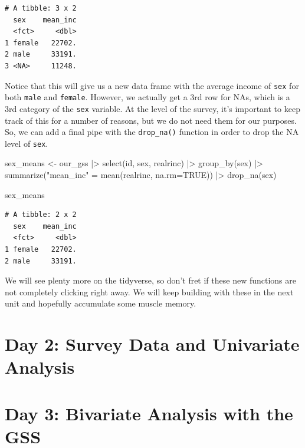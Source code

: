 \documentclass[
  letterpaper,
  DIV=11,
  numbers=noendperiod]{scrreprt}
\newenvironment{Shaded}{\begin{snugshade}}{\end{snugshade}}
\newcommand{\AttributeTok}[1]{\textcolor[rgb]{0.40,0.45,0.13}{#1}}
\newcommand{\ConstantTok}[1]{\textcolor[rgb]{0.56,0.35,0.01}{#1}}
\newcommand{\FunctionTok}[1]{\textcolor[rgb]{0.28,0.35,0.67}{#1}}
\newcommand{\NormalTok}[1]{\textcolor[rgb]{0.00,0.23,0.31}{#1}}
\newcommand{\OtherTok}[1]{\textcolor[rgb]{0.00,0.23,0.31}{#1}}
\newcommand{\SpecialCharTok}[1]{\textcolor[rgb]{0.37,0.37,0.37}{#1}}
\newcommand{\StringTok}[1]{\textcolor[rgb]{0.13,0.47,0.30}{#1}}
\begin{document}
\begin{verbatim}
# A tibble: 3 x 2
  sex    mean_inc
  <fct>     <dbl>
1 female   22702.
2 male     33191.
3 <NA>     11248.
\end{verbatim}

Notice that this will give us a new data frame with the average income
of \texttt{sex} for both \texttt{male} and \texttt{female}. However, we
actually get a 3rd row for NAs, which is a 3rd category of the
\texttt{sex} variable. At the level of the survey, it's important to
keep track of this for a number of reasons, but we do not need them for
our purposes. So, we can add a final pipe with the \texttt{drop\_na()}
function in order to drop the NA level of \texttt{sex}.

\begin{Shaded}
\begin{Highlighting}[]
\NormalTok{sex\_means }\OtherTok{\textless{}{-}}\NormalTok{ our\_gss }\SpecialCharTok{|\textgreater{}}
  \FunctionTok{select}\NormalTok{(id, sex, realrinc) }\SpecialCharTok{|\textgreater{}}
  \FunctionTok{group\_by}\NormalTok{(sex) }\SpecialCharTok{|\textgreater{}}
  \FunctionTok{summarize}\NormalTok{(}\StringTok{"mean\_inc"} \OtherTok{=} \FunctionTok{mean}\NormalTok{(realrinc, }\AttributeTok{na.rm=}\ConstantTok{TRUE}\NormalTok{)) }\SpecialCharTok{|\textgreater{}}
  \FunctionTok{drop\_na}\NormalTok{(sex)}

\NormalTok{sex\_means}
\end{Highlighting}
\end{Shaded}

\begin{verbatim}
# A tibble: 2 x 2
  sex    mean_inc
  <fct>     <dbl>
1 female   22702.
2 male     33191.
\end{verbatim}

We will see plenty more on the tidyverse, so don't fret if these new
functions are not completely clicking right away. We will keep building
with these in the next unit and hopefully accumulate some muscle memory.

\part{Day 2: Survey Data and Univariate Analysis}

\part{Day 3: Bivariate Analysis with the GSS}
\end{document}
